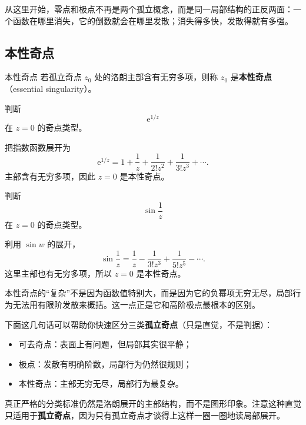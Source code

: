 \begin{zhu}{}{}
从这里开始，零点和极点不再是两个孤立概念，而是同一局部结构的正反两面：一个函数在哪里消失，它的倒数就会在哪里发散；消失得多快，发散得就有多强。
\end{zhu}

\subsection{本性奇点}

\begin{dingliyi}{本性奇点}{}
若孤立奇点 $z_0$ 处的洛朗主部含有无穷多项，则称 $z_0$ 是\textbf{本性奇点}（essential singularity）。
\end{dingliyi}

\begin{lizi}{}{}
判断
\[
    \mathrm{e}^{1/z}
\]
在 $z=0$ 的奇点类型。

\begin{jie}
把指数函数展开为
\[
    \mathrm{e}^{1/z}
    = 1+\frac{1}{z}+\frac{1}{2!z^2}+\frac{1}{3!z^3}+\cdots.
\]
主部含有无穷多项，因此 $z=0$ 是本性奇点。
\end{jie}
\end{lizi}

\begin{lizi}{}{}
判断
\[
    \sin\frac{1}{z}
\]
在 $z=0$ 的奇点类型。

\begin{jie}
利用 $\sin w$ 的展开，
\[
    \sin\frac{1}{z}
    = \frac{1}{z}-\frac{1}{3!z^3}+\frac{1}{5!z^5}-\cdots.
\]
这里主部也有无穷多项，所以 $z=0$ 是本性奇点。
\end{jie}
\end{lizi}

\begin{zhu}{}{}
本性奇点的``复杂''不是因为函数值特别大，而是因为它的负幂项无穷无尽，局部行为无法用有限阶发散来概括。这一点正是它和高阶极点最根本的区别。
\end{zhu}

\begin{tishi}[如何建立分类直觉]
下面这几句话可以帮助你快速区分三类\textbf{孤立奇点}（只是直觉，不是判据）：
\begin{itemize}
    \item 可去奇点：表面上有问题，但局部其实很平静；
    \item 极点：发散有明确阶数，局部行为仍然很规则；
    \item 本性奇点：主部无穷无尽，局部行为最复杂。
\end{itemize}
真正严格的分类标准仍然是洛朗展开的主部结构，而不是图形印象。注意这种直觉只适用于\textbf{孤立奇点}，因为只有孤立奇点才谈得上这样一圈一圈地读局部展开。
\end{tishi}

